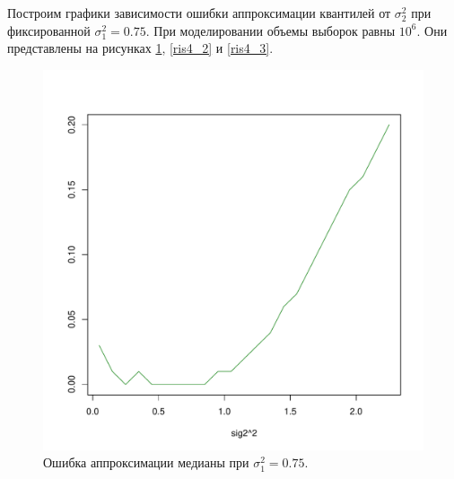 \documentclass[specialist, substylefile = spbu.rtx,
subf,href,colorlinks=true, 12pt]{disser}
\begin{document}
Построим графики зависимости ошибки аппроксимации квантилей от $\sigma_{2}^{2}$ при фиксированной $\sigma_{1}^{2} = 0.75$. При моделировании объемы выборок равны $10^{6}$. Они представлены на рисунках \ref{ris4_1}, \ref{ris4_2} и \ref{ris4_3}.

\begin{figure}[!hhh]
	\begin{center}
		\begin{minipage}[h]{0.8\linewidth}
			\includegraphics[width=1\linewidth]{img/gr_neww_1.pdf}
			\caption{Ошибка аппроксимации медианы при $\sigma_{1}^{2} = 0.75$.} %
			\label{ris4_1} %
		\end{minipage}	
	\end{center}
\end{figure}
\end{document}
